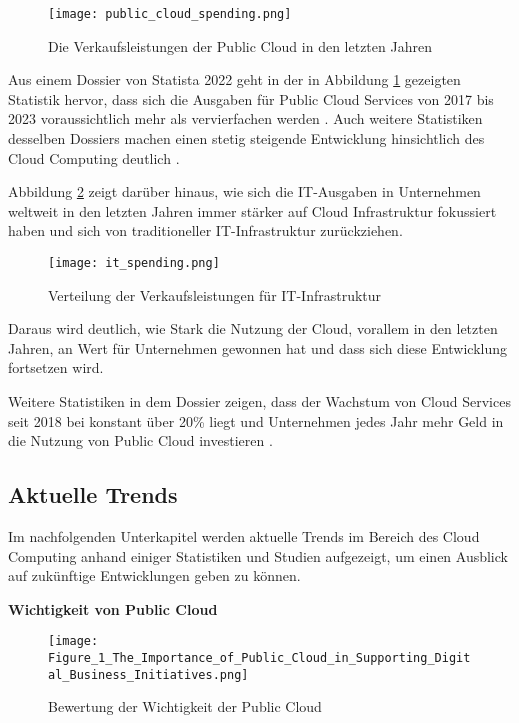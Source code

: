 \begin{figure}[H]
    \texttt{[image: public\_cloud\_spending.png]}
    \caption{Die Verkaufsleistungen der Public Cloud in den letzten Jahren \cite[S. 8]{Statista2022}}
    \label{fig:public_cloud_spending}
\end{figure}

Aus einem Dossier von Statista 2022 geht in der in Abbildung \ref{fig:public_cloud_spending} gezeigten Statistik hervor, dass sich die Ausgaben für Public Cloud Services von 2017 bis 2023 voraussichtlich mehr als vervierfachen werden \cite[Vgl.][S. 8]{Statista2022}. Auch weitere Statistiken desselben Dossiers machen einen stetig steigende Entwicklung hinsichtlich des Cloud Computing deutlich \cite[Vgl. unter anderem][S. 11ff]{Statista2022}. \pagebreak

Abbildung \ref{fig:it-spending} zeigt darüber hinaus, wie sich die IT-Ausgaben in Unternehmen weltweit in den letzten Jahren immer stärker auf Cloud Infrastruktur fokussiert haben und sich von traditioneller IT-Infrastruktur zurückziehen.

\begin{figure}[H]
    \texttt{[image: it\_spending.png]}
    \caption{Verteilung der Verkaufsleistungen für IT-Infrastruktur \cite[S. 7]{Statista2022}}
    \label{fig:it-spending}
\end{figure}

Daraus wird deutlich, wie Stark die Nutzung der Cloud, vorallem in den letzten Jahren, an Wert für Unternehmen gewonnen hat und dass sich diese Entwicklung fortsetzen wird.

Weitere Statistiken in dem Dossier zeigen, dass der Wachstum von Cloud Services seit 2018 bei konstant über 20\% liegt \cite[Vgl.][S. 6]{Statista2022} und Unternehmen jedes Jahr mehr Geld in die Nutzung von Public Cloud investieren \cite[Vgl.][S. 31f]{Statista2022}. \pagebreak

\subsection{Aktuelle Trends}
Im nachfolgenden Unterkapitel werden aktuelle Trends im Bereich des Cloud Computing anhand einiger Statistiken und Studien aufgezeigt, um einen Ausblick auf zukünftige Entwicklungen geben zu können.

\textbf{Wichtigkeit von Public Cloud}

\begin{figure}[H]
    \texttt{[image: Figure\_1\_The\_Importance\_of\_Public\_Cloud\_in\_Supporting\_Digital\_Business\_Initiatives.png]}
    \caption{Bewertung der Wichtigkeit der Public Cloud \cite[S. 2]{Ganly2022}}
    \label{fig:importance}
\end{figure}


